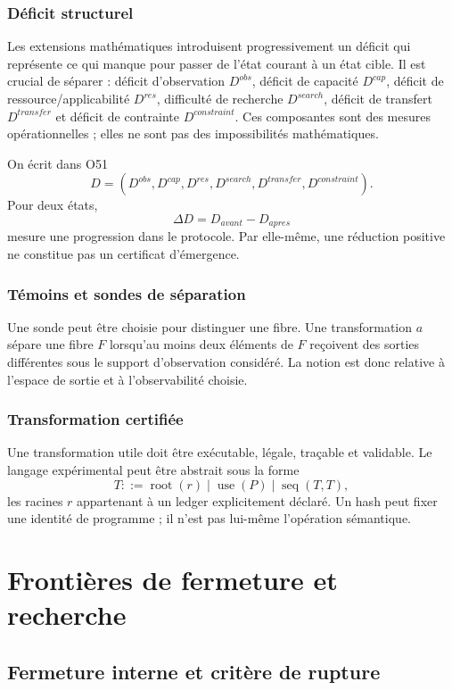 \documentclass[11pt,a4paper,openany]{book}
\begin{document}
\section{Déficit structurel}
Les extensions mathématiques introduisent progressivement un déficit qui représente ce qui manque pour passer de l'état courant à un état cible. Il est crucial de séparer : déficit d'observation \(D^{obs}\), déficit de capacité \(D^{cap}\), déficit de ressource/applicabilité \(D^{res}\), difficulté de recherche \(D^{search}\), déficit de transfert \(D^{transfer}\) et déficit de contrainte \(D^{constraint}\). Ces composantes sont des mesures opérationnelles ; elles ne sont pas des impossibilités mathématiques.

On écrit dans O51
\[
D=(D^{obs},D^{cap},D^{res},D^{search},D^{transfer},D^{constraint}).
\]
Pour deux états,
\[
\Delta D=D_{avant}-D_{apres}
\]
mesure une progression dans le protocole. Par elle-même, une réduction positive ne constitue pas un certificat d'émergence.

\section{Témoins et sondes de séparation}
Une sonde peut être choisie pour distinguer une fibre. Une transformation \(a\) sépare une fibre \(F\) lorsqu'au moins deux éléments de \(F\) reçoivent des sorties différentes sous le support d'observation considéré. La notion est donc relative à l'espace de sortie et à l'observabilité choisie.

\section{Transformation certifiée}
Une transformation utile doit être exécutable, légale, traçable et validable. Le langage expérimental peut être abstrait sous la forme
\[
T::=\operatorname{root}(r)\mid\operatorname{use}(P)\mid\operatorname{seq}(T,T),
\]
les racines \(r\) appartenant à un ledger explicitement déclaré. Un hash peut fixer une identité de programme ; il n'est pas lui-même l'opération sémantique.

\part{Frontières de fermeture et recherche}

\chapter{Fermeture interne et critère de rupture}
\end{document}
